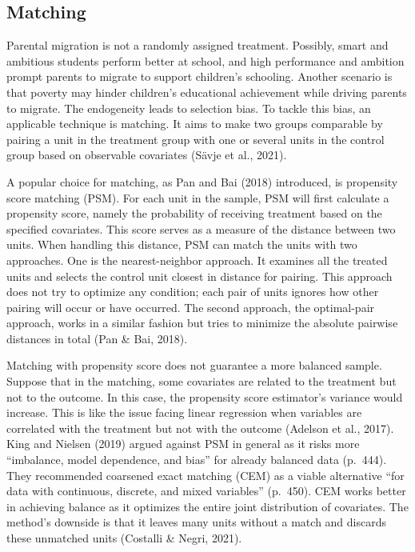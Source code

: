 \documentclass[
  man,floatsintext]{apa7}
\begin{document}
\newpage

\hypertarget{matching}{%
\subsection{Matching}\label{matching}}

Parental migration is not a randomly assigned treatment. Possibly, smart and ambitious students perform better at school, and high performance and ambition prompt parents to migrate to support children's schooling. Another scenario is that poverty may hinder children's educational achievement while driving parents to migrate. The endogeneity leads to selection bias. To tackle this bias, an applicable technique is matching. It aims to make two groups comparable by pairing a unit in the treatment group with one or several units in the control group based on observable covariates (Sävje et al., 2021).

A popular choice for matching, as Pan and Bai (2018) introduced, is propensity score matching (PSM). For each unit in the sample, PSM will first calculate a propensity score, namely the probability of receiving treatment based on the specified covariates. This score serves as a measure of the distance between two units. When handling this distance, PSM can match the units with two approaches. One is the nearest-neighbor approach. It examines all the treated units and selects the control unit closest in distance for pairing. This approach does not try to optimize any condition; each pair of units ignores how other pairing will occur or have occurred. The second approach, the optimal-pair approach, works in a similar fashion but tries to minimize the absolute pairwise distances in total (Pan \& Bai, 2018).

Matching with propensity score does not guarantee a more balanced sample. Suppose that in the matching, some covariates are related to the treatment but not to the outcome. In this case, the propensity score estimator's variance would increase. This is like the issue facing linear regression when variables are correlated with the treatment but not with the outcome (Adelson et al., 2017). King and Nielsen (2019) argued against PSM in general as it risks more ``imbalance, model dependence, and bias'' for already balanced data (p.~444). They recommended coarsened exact matching (CEM) as a viable alternative ``for data with continuous, discrete, and mixed variables'' (p.~450). CEM works better in achieving balance as it optimizes the entire joint distribution of covariates. The method's downside is that it leaves many units without a match and discards these unmatched units (Costalli \& Negri, 2021).
\end{document}
